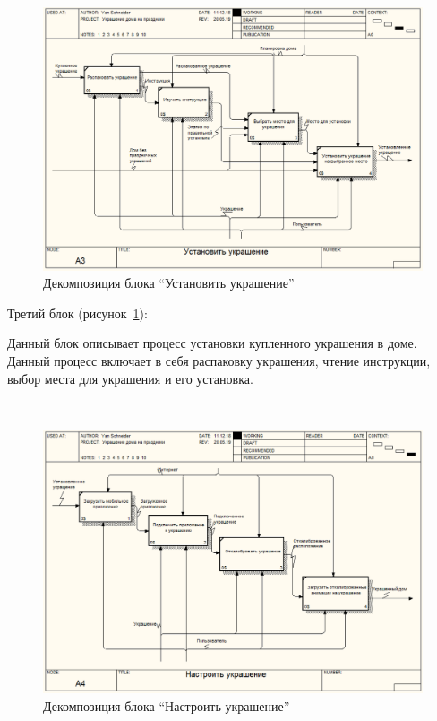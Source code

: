\begin{figure}[H]
\centering
	\includegraphics[scale=0.45]{figures/functionalModel/a3_install.png}
	\caption{Декомпозиция блока \enquote{Установить украшение}}
	\label{fig:analysis:functionalModel:a3_install}
\end{figure}

Третий блок (рисунок~\ref{fig:analysis:functionalModel:a3_install}):

Данный блок описывает процесс установки купленного украшения в доме. Данный процесс включает в себя распаковку украшения, чтение инструкции, выбор места для украшения и его установка.

 ~
\begin{figure}[H]
\centering
	\includegraphics[scale=0.45]{figures/functionalModel/a4_settings.png}
	\caption{Декомпозиция блока \enquote{Настроить украшение}}
	\label{fig:analysis:functionalModel:a4_settings}
\end{figure}

